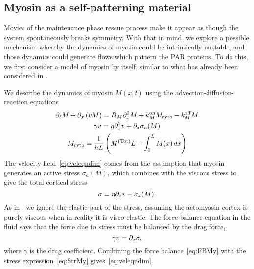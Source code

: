 \documentclass[11pt]{article}
\newcommand{\6}[1]{#1_{\text{6}}}
\newcommand{\3}[1]{#1_{\text{3}}}
\newcommand{\Tot}[1]{#1^\text{(Tot)}}
\newcommand{\My}[1]{#1_M}
\begin{document}
\subsection{Myosin as a self-patterning material} 
Movies of the maintenance phase rescue process make it appear as though the system spontaneously breaks symmetry. With that in mind, we explore a possible mechanism whereby the dynamics of myosin could be intrinsically unstable, and those dynamics could generate flows which pattern the PAR proteins. To do this, we first consider a model of myosin by itself, similar to what has already been considered in \cite{bois2011pattern}. 

We describe the dynamics of myosin $M(x,t)$ using the advection-diffusion-reaction equations
\begin{subequations}
\label{eq:MyOnly}
\begin{gather}
\Dt M + \Dx \left(v M\right) = D_M \Dx^2 M +\My{\kon}M_\text{cyto} - \My{\koff} M \\
\label{eq:veleqndim}
\gamma v = \eta \Dx^2 v + \Dx \sigma_a(M)\\
M_\text{cyto} = \frac{1}{hL}\left(\Tot{M}L-\int_0^L M(x) \, dx\right)
\end{gather}
\end{subequations}
The velocity field\ \eqref{eq:veleqndim} comes from the assumption that myosin generates an active stress $\sigma_a(M)$, which combines with the viscous stress to give the total cortical stress
\begin{equation}
\label{eq:StrMy}
\sigma = \eta \partial_x{v} + \sigma_a(M).
\end{equation}
As in \cite{bois2011pattern}, we ignore the elastic part of the stress, assuming the actomyosin cortex is purely viscous when in reality it is visco-elastic. The force balance equation in the fluid says that the force due to stress must be balanced by the drag force, 
\begin{equation}
\label{eq:FBMy}
\gamma v = \partial_x \sigma,
\end{equation}
where $\gamma$ is the drag coefficient. Combining the force balance\ \eqref{eq:FBMy} with the stress expression\ \eqref{eq:StrMy} gives\ \eqref{eq:veleqndim}.
\end{document}
